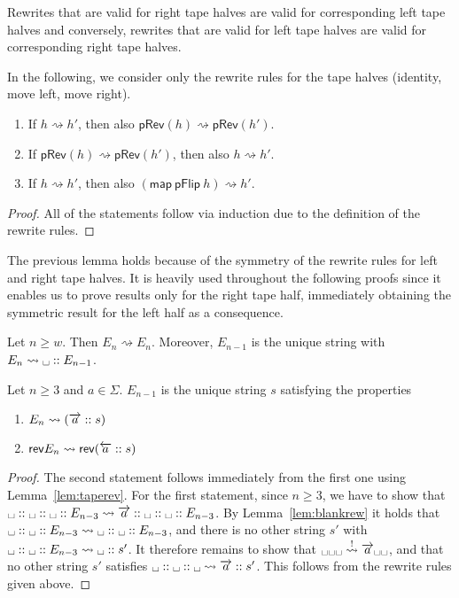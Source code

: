 \documentclass[a4paper,UKenglish,cleveref, autoref]{lipics-v2019}
\newcommand{\strent}{\rightsquigarrow}
\newcommand{\constrent}{\overset{!}{\rightsquigarrow}}
\begin{document}
\newcommand*{\pRev}[1]{\textsf{pRev}(#1)}

\begin{lemma}\label{lem:taperev}
  Rewrites that are valid for right tape halves are valid for corresponding left tape halves and conversely, rewrites that are valid for left tape halves are valid for corresponding right tape halves.

  In the following, we consider only the rewrite rules for the tape halves (identity, move left, move right). 
  \begin{enumerate}
    \item If $h \strent{} h'$, then also $\pRev{h} \strent{} \pRev{h'}$. 
    \item If $\pRev{h} \strent{} \pRev{h'}$, then also $h \strent{} h'$. 
    \item If $h \strent{} h'$, then also $(\textsf{map}~\textsf{pFlip}~h) \strent{} h'$. 
  \end{enumerate}
\end{lemma}
\begin{proof}
  All of the statements follow via induction due to the definition of the rewrite rules.
\end{proof}

The previous lemma holds because of the symmetry of the rewrite rules for left and right tape halves. It is heavily used throughout the following proofs since it enables us to prove results only for the right tape half, immediately obtaining the symmetric result for the left half as a consequence.

\begin{lemma}\label{lem:blankrew}
  Let $n \ge w$. Then $E_n \strent{} E_n$. Moreover, $E_{n-1}$ is the unique string with $E_n \strent{} \blank :: E_{n-1}$. 
\end{lemma}

\begin{lemma}\label{lem:blankshiftin}
  Let $n \ge 3$ and $a \in \Sigma$. 
  $E_{n-1}$ is the unique string $s$ satisfying the properties
  \begin{enumerate}
    \item $E_n \strent{} (\polpos{a} :: s)$
    \item $\rev{E_n} \strent{} \rev{(\polneg{a} :: s)}$
  \end{enumerate}
\end{lemma}
\begin{proof}
  The second statement follows immediately from the first one using Lemma~\ref{lem:taperev}.
  For the first statement, since $n \ge 3$, we have to show that $\blank :: \blank :: \blank :: E_{n-3} \strent{} \polpos{a} :: \blank :: \blank :: E_{n-3}$. 
  By Lemma~\ref{lem:blankrew} it holds that $\blank :: \blank :: E_{n-3} \strent{} \blank :: \blank :: E_{n-3}$, and there is no other string $s'$ with $\blank :: \blank :: E_{n-3} \strent{} \blank :: s'$. 
  It therefore remains to show that $\blank\blank\blank \constrent{} \polpos{a}\blank\blank$, and that no other string $s'$ satisfies $\blank :: \blank :: \blank \strent{} \polpos{a} :: s'$. This follows from the rewrite rules given above. 
\end{proof}
\end{document}
